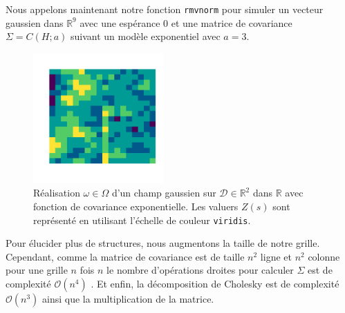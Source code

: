 \documentclass[10pt]{article} %
\begin{document}

Nous appelons maintenant notre fonction \texttt{rmvnorm} pour simuler un vecteur gaussien dans $\mathbb{R}^9$ avec une espérance $0$ et
une matrice de covariance $\Sigma = C(H ; a)$ suivant un modèle exponentiel avec $a = 3$.

\newpage

\begin{figure}[h!]
    \centering
    \includegraphics[width=5cm]{media/grid9.png}
    \caption{Réalisation $\omega \in \Omega$ d'un champ gaussien sur $\mathcal{D} \in \mathbb{R}^2$ dans $\mathbb{R}$ avec fonction de covariance exponentielle. Les valuers $Z(s)$ sont représenté en utilisant l'échelle
    de couleur \texttt{viridis}.}
\end{figure}


Pour élucider plus de structures, nous augmentons la taille de notre grille. Cependant, comme la matrice de covariance est de taille $n^2$
ligne et $n^2$ colonne pour une grille $n$ fois $n$ le nombre d'opérations droites pour calculer $\Sigma$ est de complexité $\mathcal{O}(n^4)$ .
Et enfin, la décomposition de Cholesky est de complexité $\mathcal{O}(n^3)$ ainsi que la multiplication de la matrice.

\end{document}

